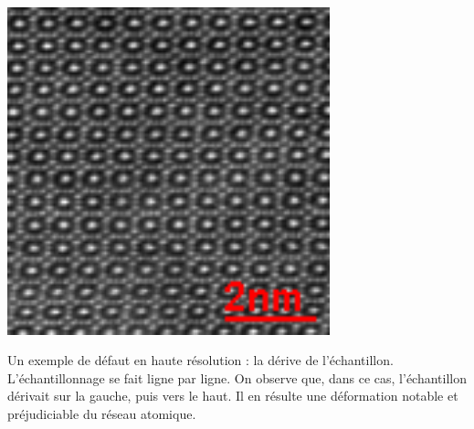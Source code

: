    \begin{marginfigure}
        \centering
        \includegraphics[width=0.7\textwidth]{img/chapitre1/figure7/drift-sc.png}
        \caption{Un exemple de défaut en haute résolution : la dérive de l'échantillon. L'échantillonnage se fait ligne par ligne. On observe que, dans ce cas, l'échantillon dérivait sur la gauche, puis vers le haut. Il en résulte une déformation notable et préjudiciable du réseau atomique.
            \protect\label{fig-drift}}
    \end{marginfigure}

